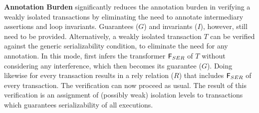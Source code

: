 \textbf{Annotation Burden} \tool significantly reduces the annotation
burden in verifying a weakly isolated transactions by eliminating the
need to annotate intermediary assertions and loop invariants.
Guarantees ($G$) and invariants ($I$), however, still need to be
provided. Alternatively, a weakly isolated transaction $T$ can be
verified against the generic serializability condition, to eliminate
the need for any annotation. In this mode, \tool first infers the
transformer ${\sf F}_{SER}$ of $T$ without considering any interference,
which then becomes its guarantee ($G$). Doing likewise for every
transaction results in a rely relation ($R$) that includes ${\sf F}_{SER}$
of every transaction. The verification can now proceed as usual. The
result of this verification is an assignment of (possibly weak)
isolation levels to transactions which guarantees serializability of
all executions. 



